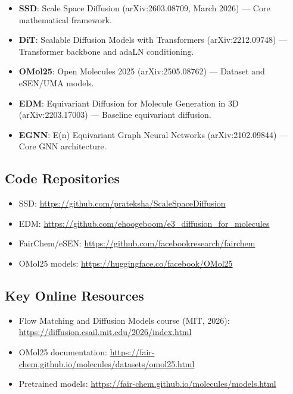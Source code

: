 \documentclass[11pt,a4paper]{article}
\begin{document}
\begin{itemize}[leftmargin=2em]
  \item \textbf{SSD}: Scale Space Diffusion (arXiv:2603.08709, March 2026)
    --- Core mathematical framework.
  \item \textbf{DiT}: Scalable Diffusion Models with Transformers
    (arXiv:2212.09748) --- Transformer backbone and adaLN conditioning.
  \item \textbf{OMol25}: Open Molecules 2025 (arXiv:2505.08762) --- Dataset
    and eSEN/UMA models.
  \item \textbf{EDM}: Equivariant Diffusion for Molecule Generation in 3D
    (arXiv:2203.17003) --- Baseline equivariant diffusion.
  \item \textbf{EGNN}: E(n) Equivariant Graph Neural Networks
    (arXiv:2102.09844) --- Core GNN architecture.
\end{itemize}

\subsection{Code Repositories}

\begin{itemize}[leftmargin=2em]
  \item SSD: \url{https://github.com/prateksha/ScaleSpaceDiffusion}
  \item EDM: \url{https://github.com/ehoogeboom/e3_diffusion_for_molecules}
  \item FairChem/eSEN: \url{https://github.com/facebookresearch/fairchem}
  \item OMol25 models: \url{https://huggingface.co/facebook/OMol25}
\end{itemize}

\subsection{Key Online Resources}

\begin{itemize}[leftmargin=2em]
  \item Flow Matching and Diffusion Models course (MIT, 2026):
    \url{https://diffusion.csail.mit.edu/2026/index.html}
  \item OMol25 documentation:
    \url{https://fair-chem.github.io/molecules/datasets/omol25.html}
  \item Pretrained models:
    \url{https://fair-chem.github.io/molecules/models.html}
\end{itemize}
\end{document}
